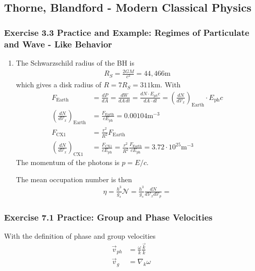 \documentclass[10pt,a4paper]{article}
\theoremstyle{definition}
\begin{document}
\subsection{{\sc Thorne, Blandford} - Modern Classical Physics}

\subsubsection{Exercise 3.3 Practice and Example: Regimes of Particulate and Wave - Like Behavior}
\begin{enumerate}[label=(\alph*)]
\item The Schwarzschild radius of the BH is
\begin{align}
    R_S=\frac{2GM}{c^2}=44,466\text{m}
\end{align}
which gives a disk radius of $R=7R_S=311\text{km}$.
With
\begin{align}
    F_\text{Earth}&=\frac{dP}{dA}=\frac{dW}{dA\,dt}=\frac{dN\cdot E_{ph} c}{dA\cdot
    dl}=\left(\frac{dN}{d\mathcal{V}_x}\right)_\text{Earth}\cdot E_\text{ph} c\\
    \left(\frac{dN}{d\mathcal{V}_x}\right)_\text{Earth}&=\frac{F_\text{Earth}}{cE_\text{ph}}=0.00104\text{m}^{-3}\\
    F_\text{CX1}&=\frac{r^2}{R^2}F_\text{Earth}\\
    \left(\frac{dN}{d\mathcal{V}_x}\right)_\text{CX1}&=\frac{F_\text{CX1}}{cE_\text{ph}}=\frac{r^2}{R^2}\frac{F_\text{Earth}}{cE_\text{ph}}=3.72\cdot10^{25}\text{m}^{-3}
\end{align}
The momentum of the photons is $p=E/c$.

The mean occupation number is then
\begin{align}
    \eta=\frac{h^3}{g_s}\mathcal{N}=\frac{h^3}{g_s}\frac{dN}{d\mathcal{V}_xd\mathcal{V}_p}=
\end{align}
\end{enumerate}


\subsubsection{Exercise 7.1 Practice: Group and Phase Velocities}
With the definition of phase and group velocities
\begin{align}
    \vec{v}_{ph}&=\frac{\omega}{k}\frac{\vec{k}}{k}\\
    \vec{v}_{g}&=\nabla_k{\omega}
\end{align}
\end{document}
